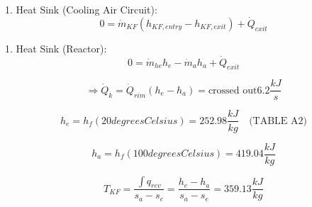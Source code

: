 1. Heat Sink (Cooling Air Circuit):
\[ 0 = \dot{m}_{KF} (h_{KF,entry} - h_{KF,exit}) + \dot{Q}_{exit} \]

1. Heat Sink (Reactor):
\[ 0 = \dot{m}_{he} h_{e} - \dot{m}_{a} h_{a} + \dot{Q}_{exit} \]

\[ \Rightarrow \dot{Q}_{k} = \dot{Q}_{rim} (h_{e} - h_{a}) = \text{crossed out} 6.2 \frac{kJ}{s} \]

\[ h_{e} = h_{f} (20 degrees Celsius) = 252.98 \frac{kJ}{kg} \quad \text{(TABLE A2)} \]

\[ h_{a} = h_{f} (100 degrees Celsius) = 419.04 \frac{kJ}{kg} \]

\[ T_{KF} = \frac{\int q_{rev}}{s_{a} - s_{e}} = \frac{h_{e} - h_{a}}{s_{a} - s_{e}} = 359.13 \frac{kJ}{kg} \]